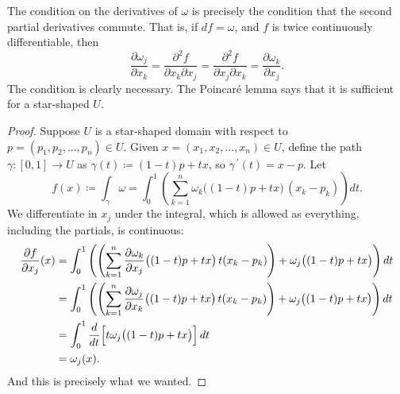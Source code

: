 The condition on the derivatives of $\omega$ is precisely the condition
that the second partial derivatives commute.  That is, if $df = \omega$,
and $f$ is twice continuously differentiable, then
\begin{equation*}
\frac{\partial \omega_j}{\partial x_k}
=
\frac{\partial^2 f}{\partial x_k \partial x_j} 
=
\frac{\partial^2 f}{\partial x_j \partial x_k} 
=
\frac{\partial \omega_k}{\partial x_j} .
\end{equation*}
The condition is clearly necessary.  The Poincar\'e lemma says that it is
sufficient for a star-shaped $U$.

\begin{proof}
Suppose $U$ is a star-shaped domain with respect to $p=(p_1,p_2,\ldots,p_n) \in U$.
Given $x = (x_1,x_2,\ldots,x_n) \in U$, define the path $\gamma \colon [0,1] \to U$ as
$\gamma(t) \coloneqq (1-t)p + tx$, so $\gamma^{\:\prime}(t) = x-p$.  Let
\begin{equation*}
f(x) \coloneqq \int_{\gamma} \omega
=
\int_0^1
\left(
\sum_{k=1}^n
\omega_k \bigl((1-t)p + tx \bigr) \, (x_k-p_k)
\right) dt .
\end{equation*}
We differentiate in $x_j$ under the integral, which is allowed as
everything, including the partials, is continuous:
\begin{equation*}
\begin{split}
\frac{\partial f}{\partial x_j}(x) & =
\int_0^1
\left(
\left(
\sum_{k=1}^n
\frac{\partial \omega_k}{\partial x_j} \bigl((1-t)p + tx \bigr) \, t
(x_k-p_k)
\right)
+
\omega_j \bigl((1-t)p + tx \bigr)
\right)
 dt
\\
& = 
\int_0^1
\left(
\left(
\sum_{k=1}^n
\frac{\partial \omega_j}{\partial x_k} \bigl((1-t)p + tx \bigr) \, t
(x_k-p_k)
\right)
+
\omega_j \bigl((1-t)p + tx \bigr)
\right) dt
\\
& = 
\int_0^1
\frac{d}{dt}
\Bigl[
t \omega_j\bigl((1-t)p + tx \bigr)
\Bigr]
\,
dt
\\
&= \omega_j(x) .
\end{split}
\end{equation*}
And this is precisely what we wanted.
\end{proof}

